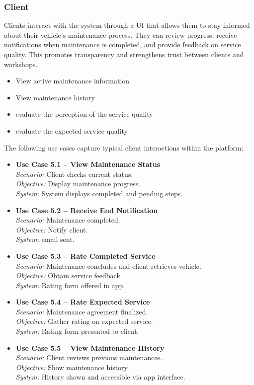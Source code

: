 \subsubsection{Client}

Clients interact with the system through a \ac{UI} that allows them to stay informed about their vehicle’s maintenance process. They can review progress, receive notifications when maintenance is completed, and provide feedback on service quality. This promotes transparency and strengthens trust between clients and workshops.


\begin{itemize}
    \item View active maintenance information
    \item View maintenance history
    \item evaluate the perception of the service quality 
    \item evaluate the expected service quality 
\end{itemize}

The following use cases capture typical client interactions within the platform:

\begin{itemize}
    \item \textbf{Use Case 5.1 – View Maintenance Status}\\
    \textit{Scenario:} Client checks current status.\\
    \textit{Objective:} Display maintenance progress.\\
    \textit{System:} System displays completed and pending steps.
    \item \textbf{Use Case 5.2 – Receive End Notification}\\
    \textit{Scenario:} Maintenance completed.\\
    \textit{Objective:} Notify client.\\
    \textit{System:} email sent.
    \item \textbf{Use Case 5.3 – Rate Completed Service}\\
    \textit{Scenario:} Maintenance concludes and client retrieves vehicle.\\
    \textit{Objective:} Obtain service feedback.\\
    \textit{System:} Rating form offered in app.
    \item \textbf{Use Case 5.4 – Rate Expected Service}\\
    \textit{Scenario:} Maintenance agreement finalized.\\
    \textit{Objective:} Gather rating on expected service.\\
    \textit{System:} Rating form presented to client.
    \item \textbf{Use Case 5.5 – View Maintenance History}\\
    \textit{Scenario:} Client reviews previous maintenances.\\
    \textit{Objective:} Show maintenance history.\\
    \textit{System:} History shown and accessible via app interface.
\end{itemize}


